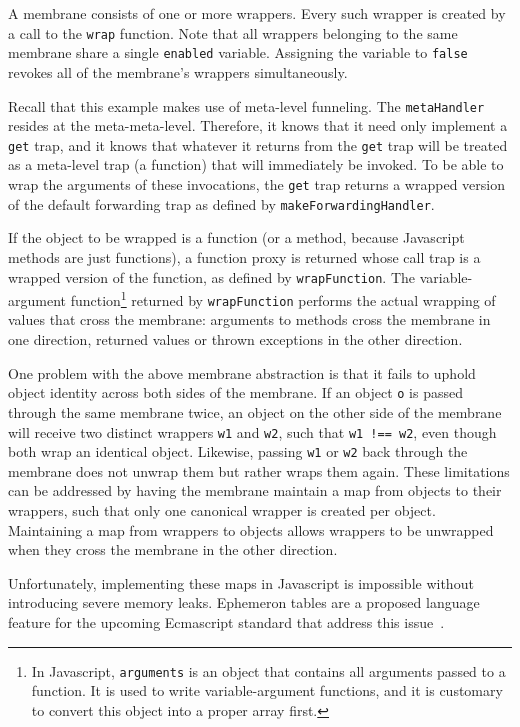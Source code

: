 \documentclass{acm_proc_article-sp}
\begin{document}
A membrane consists of one or more wrappers. Every such wrapper is created by a call to the \texttt{wrap} function. Note that all wrappers belonging to the same membrane share a single \texttt{enabled} variable. Assigning the variable to \texttt{false} revokes all of the membrane's wrappers simultaneously.

Recall that this example makes use of meta-level funneling. The \texttt{metaHandler} resides at the meta-meta-level. Therefore, it knows that it need only implement a \texttt{get} trap, and it knows that whatever it returns from the \texttt{get} trap will be treated as a meta-level trap (a function) that will immediately be invoked. To be able to wrap the arguments of these invocations, the \texttt{get} trap returns a wrapped version of the default forwarding trap as defined by \texttt{makeForwardingHandler}.

If the object to be wrapped is a function (or a method, because Javascript methods are just functions), a function proxy is returned whose call trap is a wrapped version of the function, as defined by \texttt{wrapFunction}. The variable-argument function\footnote{In Javascript, \texttt{arguments} is an object that contains all arguments passed to a function. It is used to write variable-argument functions, and it is customary to convert this object into a proper array first.} returned by \texttt{wrapFunction} performs the actual wrapping of values that cross the membrane: arguments to methods cross the membrane in one direction, returned values or thrown exceptions in the other direction.

One problem with the above membrane abstraction is that it fails to uphold object identity across both sides of the membrane. If an object \texttt{o} is passed through the same membrane twice, an object on the other side of the membrane will receive two distinct wrappers \texttt{w1} and \texttt{w2}, such that \texttt{w1 !== w2}, even though both wrap an identical object. Likewise, passing \texttt{w1} or \texttt{w2} back through the membrane does not unwrap them but rather wraps them again. These limitations can be addressed by having the membrane maintain a map from objects to their wrappers, such that only one canonical wrapper is created per object. Maintaining a map from wrappers to objects allows wrappers to be unwrapped when they cross the membrane in the other direction.

Unfortunately, implementing these maps in Javascript is impossible without introducing severe memory leaks. Ephemeron tables are a proposed language feature for the upcoming Ecmascript standard that address this issue~\cite{ephemeron_proposal}.
\end{document}
